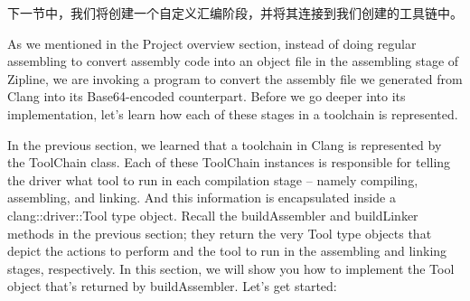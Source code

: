 下一节中，我们将创建一个自定义汇编阶段，并将其连接到我们创建的工具链中。


As we mentioned in the Project overview section, instead of doing regular assembling to convert assembly code into an object file in the assembling stage of Zipline, we are invoking a program to convert the assembly file we generated from Clang into its Base64-encoded counterpart. Before we go deeper into its implementation, let's learn how each of these stages in a toolchain is represented.

In the previous section, we learned that a toolchain in Clang is represented by the ToolChain class. Each of these ToolChain instances is responsible for telling the driver what tool to run in each compilation stage – namely compiling, assembling, and linking. And this information is encapsulated inside a clang::driver::Tool type object. Recall the buildAssembler and buildLinker methods in the previous section; they return the very Tool type objects that depict the actions to perform and the tool to run in the assembling and linking stages, respectively. In this section, we will show you how to implement the Tool object that's returned by buildAssembler. Let's get started:

